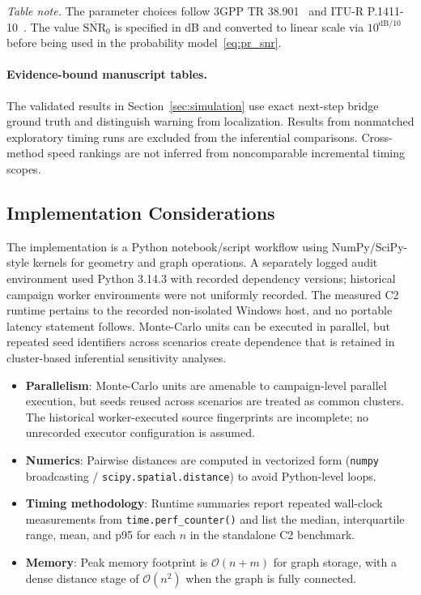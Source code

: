 \documentclass[preprint,12pt]{elsarticle}
\theoremstyle{definition}\newtheorem{definition}{Definition}
\theoremstyle{plain}\newtheorem{theorem}{Theorem}
\theoremstyle{plain}\newtheorem{lemma}{Lemma}
\theoremstyle{plain}\newtheorem{corollary}{Corollary}
\theoremstyle{plain}\newtheorem{assumption}{Assumption}
\theoremstyle{remark}\newtheorem{remark}[theorem]{Remark}
\begin{document}
\noindent\textit{Table note.} The parameter choices follow 3GPP TR 38.901~\cite{3gpp38901}
and ITU-R P.1411-10~\cite{itur1411}. The value $\overline{\mathrm{SNR}}_0$ is specified in dB
and converted to linear scale via $10^{\text{dB}/10}$ before being used in the probability
model~\eqref{eq:pr_snr}.

\paragraph{Evidence-bound manuscript tables.}
The validated results in Section~\ref{sec:simulation} use exact next-step bridge ground truth and distinguish warning from localization. Results from nonmatched exploratory timing runs are excluded from the inferential comparisons. Cross-method speed rankings are not inferred from noncomparable incremental timing scopes.

\subsection{Implementation Considerations}
\label{subsec:implementation}

The implementation is a Python notebook/script workflow using NumPy/SciPy-style kernels for geometry and graph operations. A separately logged audit environment used Python 3.14.3 with recorded dependency versions; historical campaign worker environments were not uniformly recorded. The measured C2 runtime pertains to the recorded non-isolated Windows host, and no portable latency statement follows. Monte-Carlo units can be executed in parallel, but repeated seed identifiers across scenarios create dependence that is retained in cluster-based inferential sensitivity analyses.

\begin{itemize}[leftmargin=*]
  \item \textbf{Parallelism}: Monte-Carlo units are amenable to campaign-level parallel execution, but seeds reused across scenarios are treated as common clusters. The historical worker-executed source fingerprints are incomplete; no unrecorded executor configuration is assumed.
  \item \textbf{Numerics}: Pairwise distances are computed in vectorized form (\texttt{numpy} broadcasting / \texttt{scipy.spatial.distance}) to avoid Python-level loops.
  \item \textbf{Timing methodology}: Runtime summaries report repeated wall-clock measurements from \texttt{time.perf\_counter()} and list the median, interquartile range, mean, and p95 for each $n$ in the standalone C2 benchmark.
  \item \textbf{Memory}: Peak memory footprint is $\mathcal{O}(n+m)$ for graph storage, with a dense distance stage of $\mathcal{O}(n^2)$ when the graph is fully connected.
\end{itemize}
\end{document}
